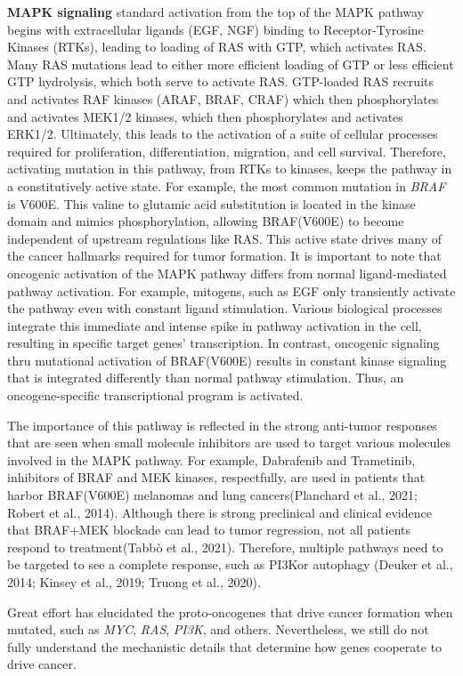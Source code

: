 \textbf{MAPK signaling} standard activation from the top of the MAPK pathway begins with extracellular ligands (EGF, NGF) binding to Receptor-Tyrosine Kinases (RTKs), leading to loading of RAS with GTP, which activates RAS. Many RAS mutations lead to either more efficient loading of GTP or less efficient GTP hydrolysis, which both serve to activate RAS. GTP-loaded RAS recruits and activates RAF kinases (ARAF, BRAF, CRAF) which then phosphorylates and activates MEK1/2 kinases, which then phosphorylates and activates ERK1/2. Ultimately, this leads to the activation of a suite of cellular processes required for proliferation, differentiation, migration, and cell survival. Therefore, activating mutation in this pathway, from RTKs to kinases, keeps the pathway in a constitutively active state. For example, the most common mutation in \emph{BRAF} is V600E. This valine to glutamic acid substitution is located in the kinase domain and mimics phosphorylation, allowing BRAF(V600E) to become independent of upstream regulations like RAS. This active state drives many of the cancer hallmarks required for tumor formation. It is important to note that oncogenic activation of the MAPK pathway differs from normal ligand-mediated pathway activation. For example, mitogens, such as EGF only transiently activate the pathway even with constant ligand stimulation. Various biological processes integrate this immediate and intense spike in pathway activation in the cell, resulting in specific target genes' transcription. In contrast, oncogenic signaling thru mutational activation of BRAF(V600E) results in constant kinase signaling that is integrated differently than normal pathway stimulation. Thus, an oncogene-specific transcriptional program is activated.

The importance of this pathway is reflected in the strong anti-tumor responses that are seen when small molecule inhibitors are used to target various molecules involved in the MAPK pathway. For example, Dabrafenib and Trametinib, inhibitors of BRAF and MEK kinases, respectfully, are used in patients that harbor BRAF(V600E) melanomas and lung cancers(Planchard et al., 2021; Robert et al., 2014). Although there is strong preclinical and clinical evidence that BRAF+MEK blockade can lead to tumor regression, not all patients respond to treatment(Tabbò et al., 2021). Therefore, multiple pathways need to be targeted to see a complete response, such as PI3Kor autophagy (Deuker et al., 2014; Kinsey et al., 2019; Truong et al., 2020).

Great effort has elucidated the proto-oncogenes that drive cancer formation when mutated, such as \emph{MYC}, \emph{RAS}, \emph{PI3K}, and others. Nevertheless, we still do not fully understand the mechanistic details that determine how genes cooperate to drive cancer.

